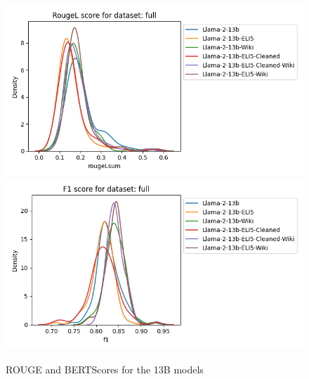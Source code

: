 \documentclass[11pt, oneside]{article}   	%
\begin{document}
\begin{figure}
\includegraphics[scale=.5]{./figures/rougelsum_13B_full}
\includegraphics[scale=.5]{./figures/bertscore_F1_13B_full}
\caption{ROUGE and BERTScores for the 13B models}
\label{fig:rouge_bertscore_13B}
\end{figure}
\end{document}
